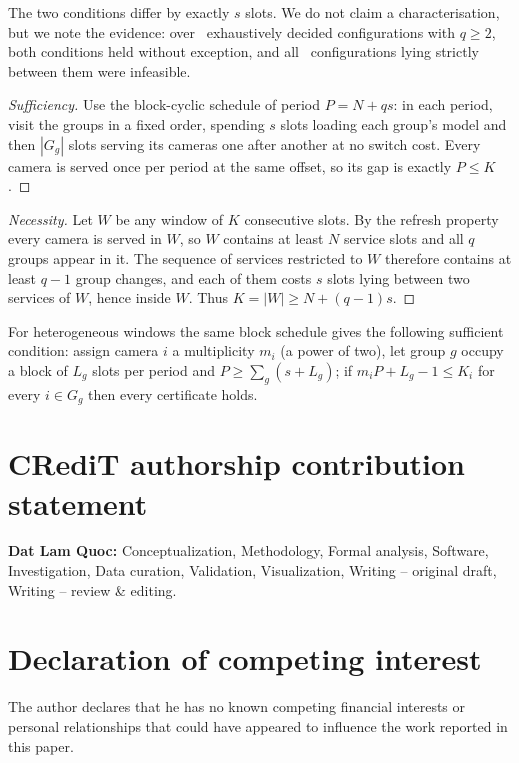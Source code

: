 \documentclass[preprint,review,12pt]{elsarticle}
\theoremstyle{definition}
\newcommand{\Nc}{N}
\begin{document}
The two conditions differ by exactly $s$ slots. We do not claim a characterisation, but we note
the evidence: over \numCthreeQtwo\ exhaustively decided configurations with $q\ge2$, both
conditions held without exception, and all \numCthreeBand\ configurations lying strictly between
them were infeasible.

\begin{proof}[Sufficiency]
Use the block-cyclic schedule of period $P=\Nc+qs$: in each period, visit the groups in a fixed
order, spending $s$ slots loading each group's model and then $|G_g|$ slots serving its cameras
one after another at no switch cost. Every camera is served once per period at the same offset, so
its gap is exactly $P\le K$.
\end{proof}
\begin{proof}[Necessity]
Let $W$ be any window of $K$ consecutive slots. By the refresh property every camera is served in
$W$, so $W$ contains at least $\Nc$ service slots and all $q$ groups appear in it. The sequence of
services restricted to $W$ therefore contains at least $q-1$ group changes, and each of them costs
$s$ slots lying between two services of $W$, hence inside $W$. Thus $K=|W|\ge \Nc+(q-1)s$.
\end{proof}

\noindent
For heterogeneous windows the same block schedule gives the following sufficient condition: assign
camera $i$ a multiplicity $m_i$ (a power of two), let group $g$ occupy a block of $L_g$ slots per
period and $P\ge\sum_g(s+L_g)$; if $m_iP+L_g-1\le K_i$ for every $i\in G_g$ then every certificate
holds.


\section*{CRediT authorship contribution statement}
\textbf{Dat Lam Quoc:} Conceptualization, Methodology, Formal analysis, Software, Investigation,
Data curation, Validation, Visualization, Writing -- original draft, Writing -- review \& editing.

\section*{Declaration of competing interest}
The author declares that he has no known competing financial interests or personal relationships
that could have appeared to influence the work reported in this paper.
\end{document}
